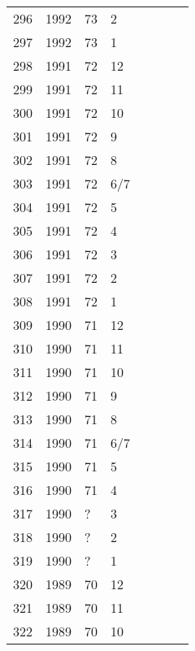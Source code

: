 \begin{longtable}{ |l|l|l|l|l|l|l|l| }
296 & 1992 & 73 &     2 &         &                &  & \\
297 & 1992 & 73 &     1 &         &                &  & \\
298 & 1991 & 72 &    12 &         &                &  & \\
299 & 1991 & 72 &    11 &         &                &  & \\
300 & 1991 & 72 &    10 &         &                &  & \\
301 & 1991 & 72 &     9 &         &                &  & \\
302 & 1991 & 72 &     8 &         &                &  & \\
303 & 1991 & 72 &   6/7 &         &                &  & \\
304 & 1991 & 72 &     5 &         &                &  & \\
305 & 1991 & 72 &     4 &         &                &  & \\
306 & 1991 & 72 &     3 &         &                &  & \\
307 & 1991 & 72 &     2 &         &                &  & \\
308 & 1991 & 72 &     1 &         &                &  & \\
309 & 1990 & 71 &    12 &         &                &  & \\
310 & 1990 & 71 &    11 &         &                &  & \\
311 & 1990 & 71 &    10 &         &                &  & \\
312 & 1990 & 71 &     9 &         &                &  & \\
313 & 1990 & 71 &     8 &         &                &  & \\
314 & 1990 & 71 &   6/7 &         &                &  & \\
315 & 1990 & 71 &     5 &         &                &   & \\
316 & 1990 & 71 &     4 &         &                &  & \\
317 & 1990 & ?  &     3 &         &                &  & \\
318 & 1990 & ?  &     2 &         &                &  & \\
319 & 1990 & ?  &     1 &         &                &  & \\
320 & 1989 & 70 &    12 &         &                &   & \\
321 & 1989 & 70 &    11 &         &                &  & \\
322 & 1989 & 70 &    10 &         &                &  & \\

\end{longtable}
